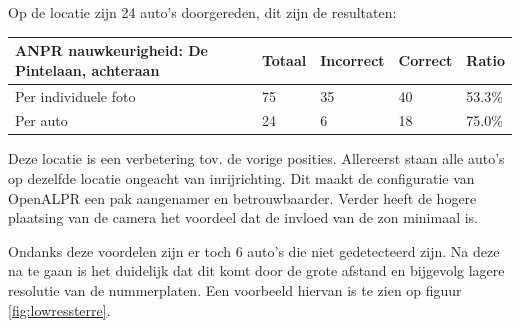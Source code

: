 Op de locatie zijn 24 auto's doorgereden, dit zijn de resultaten:
\begin{table}[h!]
	\centering
	\begin{tabular}{l|l|l|l|l}
		\textbf{ANPR nauwkeurigheid: De Pintelaan, achteraan} & Totaal & Incorrect & Correct & Ratio	\\ \hline
		Per individuele foto 	& 75 & 35	& 40	& 53.3\%\\
		Per auto				& 24 & 6	& 18 	& 75.0\%\\
	\end{tabular}
\end{table}

Deze locatie is een verbetering tov. de vorige posities. Allereerst staan alle auto's op dezelfde locatie ongeacht van inrijrichting. Dit maakt de configuratie van OpenALPR een pak aangenamer en betrouwbaarder. Verder heeft de hogere plaatsing van de camera het voordeel dat de invloed van de zon minimaal is.

Ondanks deze voordelen zijn er toch 6 auto's die niet gedetecteerd zijn. Na deze na te gaan is het duidelijk dat dit komt door de grote afstand en bijgevolg lagere resolutie van de nummerplaten. Een voorbeeld hiervan is te zien op figuur \ref{fig:lowressterre}.

